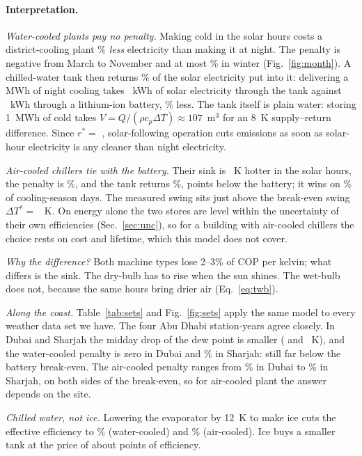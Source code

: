 \documentclass[10pt,a4paper]{article}
\begin{document}
\paragraph{Interpretation.}
\emph{Water-cooled plants pay no penalty.} Making cold in the solar hours costs a district-cooling plant
\PiAbsWC\% \emph{less} electricity than making it at night. The penalty is negative from March to November and at most
\PiMonthMaxWC\% in winter (Fig.~\ref{fig:month}). A chilled-water tank then returns \EffWC\% of the solar electricity
put into it: delivering a MWh of night cooling takes \RouteTankWC~kWh of solar electricity through the tank against
\RouteBattWC~kWh through a lithium-ion battery, \SavingWC\% less. The tank itself is plain water: storing 1~MWh of cold
takes $V=Q/(\rho c_p\Delta T)\approx107$~m$^3$ for an 8~K supply--return difference. Since $r^*=$ \RStarWC,
solar-following operation cuts emissions as soon as solar-hour electricity is any cleaner than night electricity.

\emph{Air-cooled chillers tie with the battery.} Their sink is \SwingAC~K hotter in the solar hours, the penalty is
\PiAC\%, and the tank returns \EffAC\%, \BattMinusTankAC{} points below the battery; it wins on \DaysAC\% of
cooling-season days. The measured swing sits just above the break-even swing $\Delta T^*=$ \SwingStarAC~K. On
energy alone the two stores are level within the uncertainty of their own efficiencies (Sec.~\ref{sec:unc}), so for a
building with air-cooled chillers the choice rests on cost and lifetime, which this model does not cover.

\emph{Why the difference?} Both machine types lose 2--3\% of COP per kelvin; what differs is the sink. The dry-bulb
has to rise when the sun shines. The wet-bulb does not, because the same hours bring drier air (Eq.~\ref{eq:twb}).

\emph{Along the coast.} Table~\ref{tab:sets} and Fig.~\ref{fig:sets} apply the same model to every weather data set
we have. The four Abu Dhabi station-years agree closely. In Dubai and Sharjah the midday drop of the dew point is
smaller (\DTdpDubai{} and \DTdpSharjah~K), and the water-cooled penalty is zero in Dubai and \PiWCSharjah\% in
Sharjah: still far below the battery break-even. The air-cooled penalty ranges from \PiACDubai\% in Dubai to \PiACSharjah\% in Sharjah,
on both sides of the break-even, so for air-cooled plant the answer depends on the site.

\emph{Chilled water, not ice.} Lowering the evaporator by 12~K to make ice cuts the effective efficiency to
\IceWC\% (water-cooled) and \IceAC\% (air-cooled). Ice buys a smaller tank at the price of about \IceLossWC{} points of
efficiency.
\end{document}
